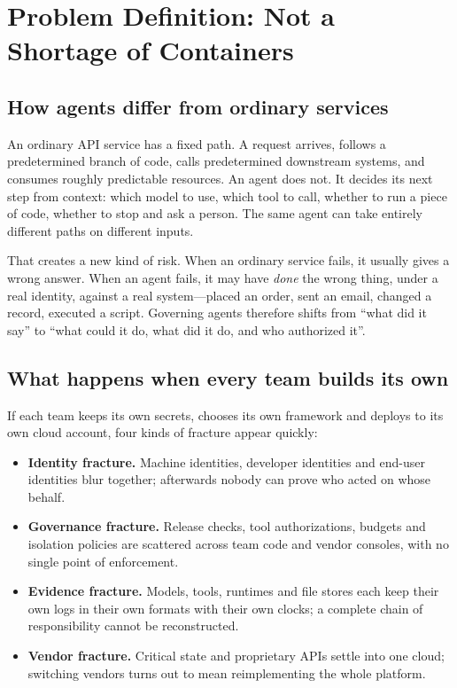 \section{Problem Definition: Not a Shortage of Containers}
\label{sec:problem}

\subsection{How agents differ from ordinary services}

An ordinary API service has a fixed path. A request arrives, follows a predetermined branch of code, calls predetermined downstream systems, and consumes roughly predictable resources. An agent does not. It decides its next step from context: which model to use, which tool to call, whether to run a piece of code, whether to stop and ask a person. The same agent can take entirely different paths on different inputs.

That creates a new kind of risk. When an ordinary service fails, it usually gives a wrong answer. When an agent fails, it may have \emph{done} the wrong thing, under a real identity, against a real system---placed an order, sent an email, changed a record, executed a script. Governing agents therefore shifts from ``what did it say'' to ``what could it do, what did it do, and who authorized it''.

\subsection{What happens when every team builds its own}

If each team keeps its own secrets, chooses its own framework and deploys to its own cloud account, four kinds of fracture appear quickly:

\begin{itemize}
  \item \textbf{Identity fracture.} Machine identities, developer identities and end-user identities blur together; afterwards nobody can prove who acted on whose behalf.
  \item \textbf{Governance fracture.} Release checks, tool authorizations, budgets and isolation policies are scattered across team code and vendor consoles, with no single point of enforcement.
  \item \textbf{Evidence fracture.} Models, tools, runtimes and file stores each keep their own logs in their own formats with their own clocks; a complete chain of responsibility cannot be reconstructed.
  \item \textbf{Vendor fracture.} Critical state and proprietary APIs settle into one cloud; switching vendors turns out to mean reimplementing the whole platform.
\end{itemize}

